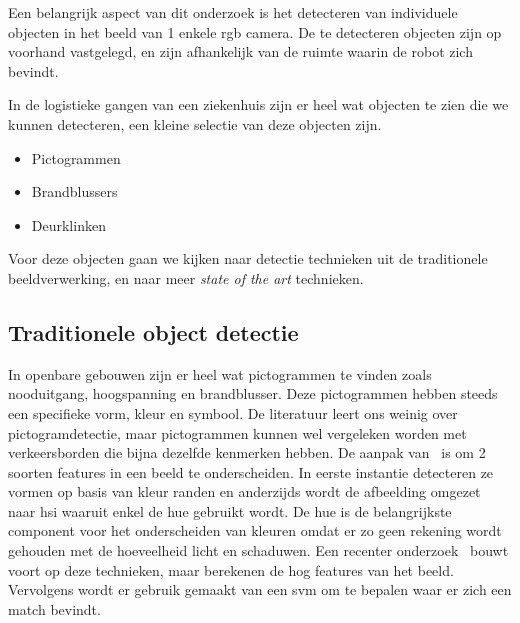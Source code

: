         Een belangrijk aspect van dit onderzoek is het detecteren van individuele objecten in het beeld van 1 enkele \gls{rgb} camera.
        De te detecteren objecten zijn op voorhand vastgelegd, en zijn afhankelijk van de ruimte waarin de robot zich bevindt.

        In de logistieke gangen van een ziekenhuis zijn er heel wat objecten te zien die we kunnen detecteren, een kleine selectie van deze objecten zijn.

        \begin{itemize}
            \item Pictogrammen
            \item Brandblussers
            \item Deurklinken
        \end{itemize}

        Voor deze objecten gaan we kijken naar detectie technieken uit de traditionele beeldverwerking, en naar meer \textit{state of the art} technieken. 


        \subsection{Traditionele object detectie} \label{sec:trad_obj_det}
            In openbare gebouwen zijn er heel wat pictogrammen te vinden zoals nooduitgang, hoogspanning en brandblusser. Deze pictogrammen hebben steeds een specifieke vorm, kleur en symbool.
            De literatuur leert ons weinig over pictogramdetectie, maar pictogrammen kunnen wel vergeleken worden met verkeersborden die bijna dezelfde kenmerken hebben.
            De aanpak van~\cite{Fang2003} is om 2 soorten features in een beeld te onderscheiden. In eerste instantie detecteren ze vormen op basis van kleur randen en anderzijds wordt de
            afbeelding omgezet naar \gls{hsi} waaruit enkel de hue gebruikt wordt. De hue is de belangrijkste component voor het onderscheiden van kleuren omdat er zo geen rekening wordt gehouden
            met de hoeveelheid licht en schaduwen.
            Een recenter onderzoek~\cite{Zabihi2017} bouwt voort op deze technieken,
            maar berekenen de \gls{hog} features van het beeld. Vervolgens wordt er gebruik gemaakt van een \gls{svm} om te bepalen waar er zich een match bevindt.

